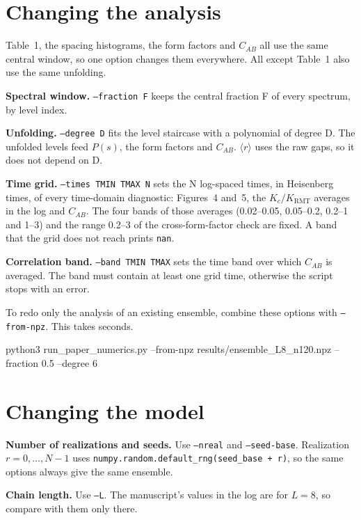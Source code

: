 \documentclass[11pt,a4paper]{article}
\newcommand{\code}[1]{\texttt{\textcolor{codeink}{#1}}}
\newcommand{\lead}[1]{\textbf{#1}\enspace}
\begin{document}
\section{Changing the analysis}\label{sec:analysis}

Table~1, the spacing histograms, the form factors and $C_{AB}$ all use the same central window, so one option
changes them everywhere. All except Table~1 also use the same unfolding.

\lead{Spectral window.} \code{--fraction F} keeps the central fraction F of every spectrum, by level index.

\lead{Unfolding.} \code{--degree D} fits the level staircase with a polynomial of degree D. The unfolded levels feed
$P(s)$, the form factors and $C_{AB}$. $\langle r\rangle$ uses the raw gaps, so it does not depend on D.

\lead{Time grid.} \code{--times TMIN TMAX N} sets the N log-spaced times, in Heisenberg times, of every time-domain
diagnostic: Figures~4 and~5, the $K_c/K_{\mathrm{RMT}}$ averages in the log and $C_{AB}$. The four bands of those
averages (0.02--0.05, 0.05--0.2, 0.2--1 and 1--3) and the range 0.2--3 of the cross-form-factor check are fixed. A
band that the grid does not reach prints \code{nan}.

\lead{Correlation band.} \code{--band TMIN TMAX} sets the time band over which $C_{AB}$ is averaged. The band must
contain at least one grid time, otherwise the script stops with an error.

To redo only the analysis of an existing ensemble, combine these options with \code{--from-npz}. This takes seconds.
\begin{shell}
python3 run_paper_numerics.py --from-npz results/ensemble_L8_n120.npz --fraction 0.5 --degree 6
\end{shell}

\section{Changing the model}\label{sec:model}

\lead{Number of realizations and seeds.} Use \code{--nreal} and \code{--seed-base}. Realization $r = 0, \ldots, N-1$ uses
\code{numpy.random.default\_rng(seed\_base + r)}, so the same options always give the same ensemble.

\lead{Chain length.} Use \code{--L}. The manuscript's values in the log are for $L = 8$, so compare with them only there.
\end{document}
